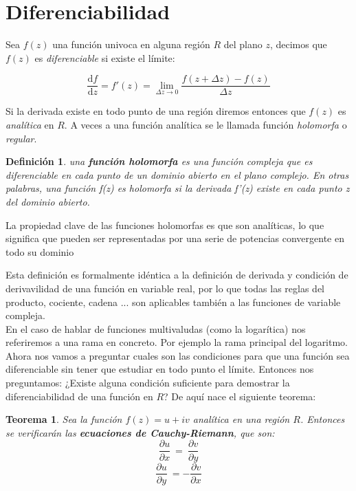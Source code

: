 \documentclass[12pt,a4paper]{book}
\newcommand{\parciales}[2]{\frac{\partial #1}{\partial #2}}
\newcommand{\D}{\mathrm{d}}
\newcommand{\derivadas}[2]{\frac{\D #1}{\D #2}}
\newtheorem{theorem}{Teorema}[section]
\newtheorem{definicion}{Definición}[section]
\begin{document}
\section{Diferenciabilidad}

Sea $f(z)$ una función univoca en alguna región $R$ del plano $z$, decimos que $f(z)$ es \textit{diferenciable} si existe el límite:

\begin{equation}
\derivadas{f}{z} = f'(z) = \lim_{\Delta z \rightarrow 0} \frac{f(z+\Delta z)-f(z)}{\Delta z}
\end{equation}

Si la derivada existe en todo punto de una región diremos entonces que $f(z)$ es \textit{analítica} en $R$. A veces a una función analítica se le llamada función \textit{holomorfa} o \textit{regular}. \\


\begin{definicion}
una \textbf{función holomorfa} es una función compleja que es diferenciable en cada punto de un dominio abierto en el plano complejo. En otras palabras, una función f(z) es holomorfa si la derivada f'(z) existe en cada punto z del dominio abierto. 
\end{definicion}

La propiedad clave de las funciones holomorfas es que son analíticas, lo que significa que pueden ser representadas por una serie de potencias convergente en todo su dominio


Esta definición es formalmente idéntica a la definición de derivada y condición de derivavilidad de una función en variable real, por lo que todas las reglas del producto, cociente, cadena ... son aplicables también a las funciones de variable compleja. \\

En el caso de hablar de funciones multivaludas (como la logarítica) nos referiremos a una rama en concreto. Por ejemplo la rama principal del logaritmo. \\


Ahora nos vamos a preguntar cuales son las condiciones para que una función sea diferenciable sin tener que estudiar en todo punto el límite. Entonces nos preguntamos: ¿Existe alguna condición suficiente para demostrar la diferenciabilidad de una función en $R$? De aquí nace el siguiente teorema: \\

\begin{theorem}
Sea la función $f(z)=u+iv$ analítica en una región $R$. Entonces se verificarán las \textbf{ecuaciones de Cauchy-Riemann}, que son:
$$ \parciales{u}{x} \ = \ \parciales{v}{y}  $$
$$ \parciales{u}{y} \ = - \parciales{v}{x} $$
\end{theorem}
\end{document}
